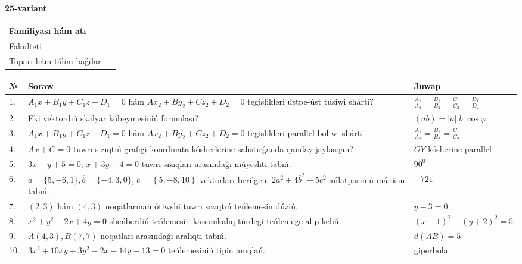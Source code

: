 \documentclass{article}
\begin{document}
\egroup

\newpage


\textbf{25-variant}\\

\bgroup
\def\arraystretch{1.6} %

\begin{tabular}{|m{5.7cm}|m{9.5cm}|}
\hline
Familiyası hám atı & \\
\hline
Fakulteti  & \\
\hline
Toparı hám tálim baǵdarı  & \\
\hline
\end{tabular}

\vspace{1cm}

\begin{tabular}{|m{0.7cm}|m{10cm}|m{4cm}|}
\hline
№ & Soraw & Juwap \\
\hline
1. & $A_1x+B_1y+C_1z+D_1=0$ hám $Ax_2+By_2+Cz_2+D_2=0$ tegislikleri ústpe-úst túsiwi shárti? & $\frac{A_1}{A_2}=\frac{B_1}{B_2}=\frac{C_1}{C_2}=\frac{D_1}{D_2}$ \\
\hline
2. & Eki vektordıń skalyar kóbeymesiniń formulası? & $(ab)=|a||b|\cos\varphi$ \\
\hline
3. & $A_1x+B_1y+C_1z+D_1=0$ hám $Ax_2+By_2+Cz_2+D_2=0$ tegislikleri parallel bolıwı shárti & $\frac{A_1}{A_2}=\frac{B_1}{B_2}=\frac{C_1}{C_2}$ \\
\hline
4. & $Ax+C=0$ tuwrı sızıqtıń grafigi koordinata kósherlerine salıstırǵanda qanday jaylasqan? & $OY$ kósherine parallel \\
\hline
5. & $3x-y+5=0$, $x+3y-4=0$ tuwrı sızıqları arasındaǵı múyeshti tabıń. & $90^{0}$ \\
\hline
6. & $\overline{a}=\{5,-6, 1 \}, \overline{b}=\{-4, 3, 0 \} $, $\overline{c}=\left\{ 5,-8, 10 \right\}$ vektorları berilgen. $2{\overline{a}}^{2}+4{\overline{b}}^{2}-5{\overline{c}}^{2}$ ańlatpasınıń mánisin tabıń. & $-721$ \\
\hline
7. & $(2, 3)$ hám $(4, 3)$ noqatlarınan ótiwshi tuwrı sızıqtıń teńlemesin dúziń. & $ y-3=0$ \\
\hline
8. & $x^{2}+y^{2}-2x+4y=0$ sheńberdiń teńlemesin kanonikalıq túrdegi teńlemege alıp keliń. & $(x-1)^{2}+(y+2)^{2}=5$ \\
\hline
9. & $A(4, 3), B(7, 7)$ noqatları arasındaǵı aralıqtı tabıń. & $d(AB)=5$ \\
\hline
10. & $3x^{2}+10xy+3y^{2}-2x-14y-13=0$ teńlemesiniń tipin anıqlań. & giperbola \\
\hline
\end{tabular}
\end{document}
